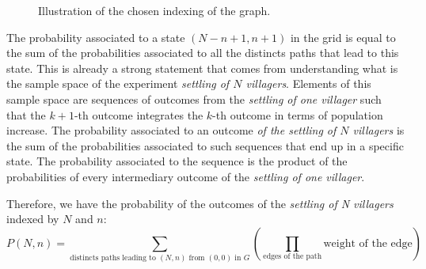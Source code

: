 \documentclass{beamer}
\begin{document}
\begin{figure}[H]
    \vspace{20pt}
    \caption{Illustration of the chosen indexing of the graph.}
    \label{fig:grid2}
\end{figure}


The probability associated to a state $(N-n+1,n+1)$ in the grid is equal to the sum of the probabilities associated to all the distincts paths that lead to this state. 
This is already a strong statement that comes from understanding what is the sample space of the experiment \textit{settling of $N$ villagers}. 
Elements of this sample space are sequences of outcomes from the \textit{settling of one villager} such that the $k+1$-th outcome integrates the $k$-th outcome in terms of population increase. The probability associated to an outcome \textit{of the settling of $N$ villagers} is the sum of the probabilities associated to such sequences that end up in a specific state.  
The probability associated to the sequence is the product of the probabilities of every intermediary outcome of the \textit{settling of one villager}.

Therefore, we have the probability of the outcomes of the \textit{settling of N villagers} indexed by $N$ and $n$:
\[
P(N,n)= \sum_{\text{distincts paths leading to } (N,n) \text{ from } (0,0) \text{ in }G} \left( \prod_{\text{edges of the path}}{\text{weight of the edge}} \right)
\]
\end{document}

